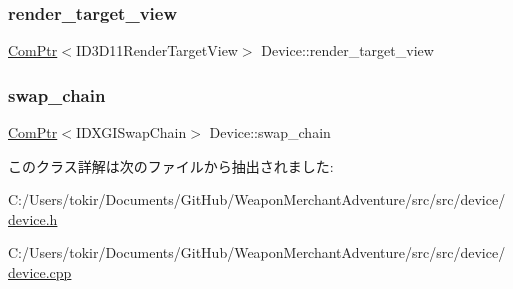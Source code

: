 \subsubsection{\texorpdfstring{render\+\_\+target\+\_\+view}{render\_target\_view}}
{\footnotesize\ttfamily \mbox{\hyperlink{common_8h_ab7d7d9064a34dd725663b1dbee652aca}{Com\+Ptr}}$<$I\+D3\+D11\+Render\+Target\+View$>$ Device\+::render\+\_\+target\+\_\+view}

\mbox{\label{class_device_a8e522e4b61ad77b6581d4a160234c790}} 
\subsubsection{\texorpdfstring{swap\+\_\+chain}{swap\_chain}}
{\footnotesize\ttfamily \mbox{\hyperlink{common_8h_ab7d7d9064a34dd725663b1dbee652aca}{Com\+Ptr}}$<$I\+D\+X\+G\+I\+Swap\+Chain$>$ Device\+::swap\+\_\+chain}



このクラス詳解は次のファイルから抽出されました\+:\begin{DoxyCompactItemize}
\item 
C\+:/\+Users/tokir/\+Documents/\+Git\+Hub/\+Weapon\+Merchant\+Adventure/src/src/device/\mbox{\hyperlink{device_8h}{device.\+h}}\item 
C\+:/\+Users/tokir/\+Documents/\+Git\+Hub/\+Weapon\+Merchant\+Adventure/src/src/device/\mbox{\hyperlink{device_8cpp}{device.\+cpp}}\end{DoxyCompactItemize}
